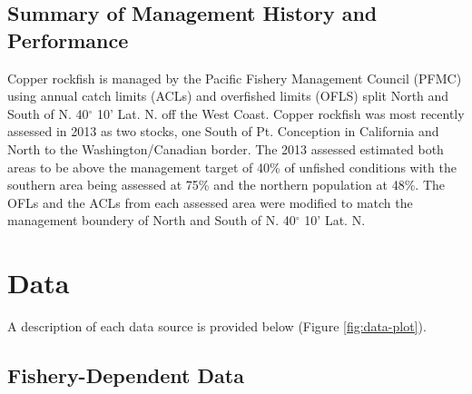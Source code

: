 \documentclass[11pt,
  english,
  a4paper,
]{article}
\begin{document}

\hypertarget{summary-of-management-history-and-performance}{%
\subsection{Summary of Management History and Performance}\label{summary-of-management-history-and-performance}}

\leavevmode\tagmcend\tagstructend


Copper rockfish is managed by the Pacific Fishery Management Council (PFMC) using annual catch limits (ACLs) and overfished limits (OFLS) split North and South of N. 40{\(^\circ\)\leavevmode\tagmcend\tagstructend} 10' Lat. N. off the West Coast. Copper rockfish was most recently assessed in 2013 as two stocks, one South of Pt. Conception in California and North to the Washington/Canadian border. The 2013 assessed estimated both areas to be above the management target of 40\% of unfished conditions with the southern area being assessed at 75\% and the northern population at 48\%. The OFLs and the ACLs from each assessed area were modified to match the management boundery of North and South of N. 40{\(^\circ\)\leavevmode\tagmcend\tagstructend} 10' Lat. N.

\leavevmode\tagmcend\tagstructend\par


\hypertarget{data}{%
\section{Data}\label{data}}

\leavevmode\tagmcend\tagstructend


A description of each data source is provided below (Figure \ref{fig:data-plot}).

\leavevmode\tagmcend\tagstructend\par


\hypertarget{fishery-dependent-data}{%
\subsection{Fishery-Dependent Data}\label{fishery-dependent-data}}
\end{document}
